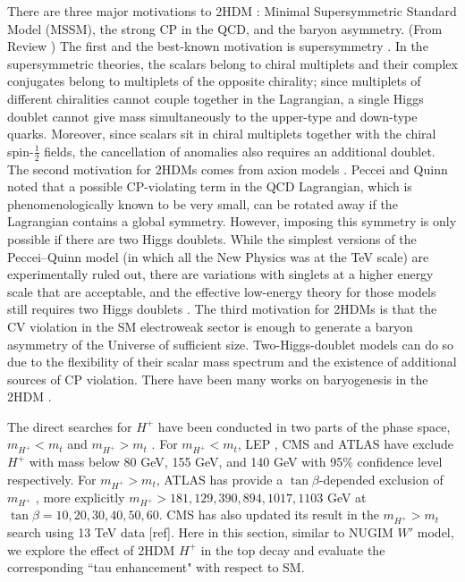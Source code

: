 There are three major motivations to 2HDM \cite{BRANCO20121}: Minimal Supersymmetric Standard Model (MSSM), the strong CP in the QCD, and the baryon asymmetry. (From Review \cite{BRANCO20121}) The first and the best-known motivation is supersymmetry \cite{HABER198575}. In the supersymmetric theories, the scalars belong to chiral multiplets and their complex conjugates belong to multiplets of the opposite chirality; since multiplets of different chiralities cannot couple together in the Lagrangian, a single Higgs doublet cannot give mass simultaneously to the upper-type and down-type quarks. Moreover, since scalars sit in chiral multiplets together with the chiral spin-$\frac{1}{2}$ fields, the cancellation of anomalies also requires an additional doublet. The second motivation for 2HDMs comes from axion models \cite{KIM19871}. Peccei and Quinn \cite{PhysRevLett.38.1440} noted that a possible CP-violating term in the QCD Lagrangian, which is phenomenologically known to be very small, can be rotated away if the Lagrangian contains a global symmetry. However, imposing this symmetry is only possible if there are two Higgs doublets. While the simplest versions of the Peccei–Quinn model (in which all the New Physics was at the TeV scale) are experimentally ruled out, there are variations with singlets at a higher energy scale that are acceptable, and the effective low-energy theory for those models still requires two Higgs doublets \cite{KIM19871}. The third motivation for 2HDMs is that the CV violation in the SM electroweak sector is enough \cite{Trodden:1998qg} to generate a baryon asymmetry of the Universe of sufficient size. Two-Higgs-doublet models can do so due to the flexibility of their scalar mass spectrum \cite{Trodden:1998qg} and the existence of additional sources of CP violation. There have been many works on baryogenesis in the 2HDM \cite{TUROK1991471, Joyce:1994zt}. 

The direct searches for $H^+$ have been conducted in two parts of the phase space, $m_{H^+} < m_t$  and $m_{H^+} > m_t$ \cite{pdg2020}. For $m_{H^+} < m_t$, LEP \cite{Abbiendi:2013hk}, CMS \cite{Khachatryan:2015qxa} and ATLAS \cite{Aad:2014kga} have exclude $H^+$ with mass below 80 GeV, 155 GeV, and 140 GeV with 95\% confidence level respectively. For $m_{H^+} > m_t$, ATLAS has provide a $\tan\beta$-depended exclusion of $m_{H^+}$ \cite{Aaboud:2018gjj}, more explicitly $m_{H^+}>181,129,390,894,1017,1103$ GeV at $\tan\beta=10,20,30,40,50,60$. CMS has also updated its result in the $m_{H^+} > m_t$ search using 13 TeV data [ref]. Here in this section, similar to NUGIM $W'$ model, we explore the effect of 2HDM $H^+$ in the top decay and evaluate the corresponding ``tau enhancement" with respect to SM.







